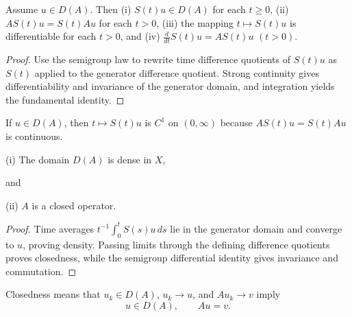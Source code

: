 \begin{theorem}
\label{thm:semigroup-differential-properties}

Assume $u \in D(A)$. Then
(i) $S(t)u \in D(A)$ for each $t \geq 0$,
(ii) $AS(t)u = S(t)Au$ for each $t > 0$,
(iii) the mapping $t \mapsto S(t)u$ is differentiable for each $t > 0$,
and
(iv) $\frac{d}{dt}S(t)u = AS(t)u$ \quad $(t > 0)$.
\end{theorem}

\begin{proof}
\sketch Use the semigroup law to rewrite time difference quotients of $S(t)u$ as $S(t)$ applied to the generator difference quotient. Strong continuity gives differentiability and invariance of the generator domain, and integration yields the fundamental identity.
\end{proof}

\begin{remark}
\label{rem:semigroup-c1-remark}

If $u\in D(A)$, then $t\mapsto S(t)u$ is $C^1$ on $(0,\infty)$ because $AS(t)u=S(t)Au$ is continuous.
\end{remark}

\begin{theorem}
\label{thm:semigroup-generator-properties}

(i) The domain $D(A)$ is dense in $X$,

and

(ii) $A$ is a closed operator.
\end{theorem}

\begin{proof}
\sketch Time averages $t^{-1}\int_0^tS(s)u\,ds$ lie in the generator domain and converge to $u$, proving density. Passing limits through the defining difference quotients proves closedness, while the semigroup differential identity gives invariance and commutation.
\end{proof}

\begin{remark}
\label{rem:closed-operator-definition}

Closedness means that $u_k\in D(A)$, $u_k\to u$, and $Au_k\to v$ imply
\[
u\in D(A),\qquad Au=v.
\]
\end{remark}


